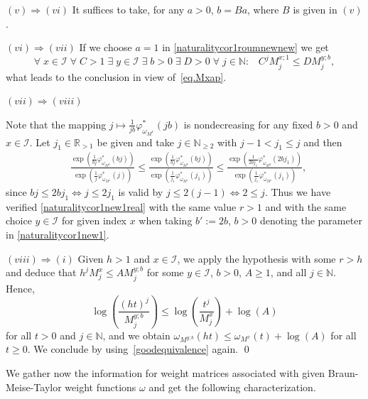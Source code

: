 \documentclass[10pt]{amsart}%
\numberwithin{equation}{section}
\theoremstyle{plain}
\newcommand{\RR}{\mathbb{R}}
\newcommand{\NN}{\mathbb{N}}
\begin{document}
$(v)\Rightarrow(vi)$ It suffices to take, for any $a>0$, $b=Ba$, where $B$ is given in $(v)$.\vspace{6pt}

$(vi)\Rightarrow(vii)$ If we choose $a=1$ in \eqref{naturalitycor1roumnewnew} we get
$$
\forall\;x\in\mathcal{I}\;\forall\;C> 1\;\exists\;y\in\mathcal{I}\;\exists\;b>0\;\exists\;D>0\;\forall\;j\in\NN:\;\;\;C^jM^{x;1}_j\le DM^{y;b}_j,
$$
what leads to the conclusion in view of~\eqref{eq.Mxap}.\vspace{6pt}

$(vii)\Rightarrow(viii)$

Note that the mapping $j\mapsto\frac{1}{jb}\varphi^{*}_{\omega_{M^x}}(jb)$ is nondecreasing for any fixed $b>0$ and $x\in\mathcal{I}$. Let $j_1\in\RR_{>1}$ be given and take $j\in\NN_{\ge 2}$ with $j-1<j_1\le j$ and then
\begin{align*}
&\frac{\exp(\frac{1}{bj}\varphi^{*}_{\omega_{M^y}}(bj))}{\exp(\frac{1}{j}\varphi^{*}_{\omega_{M^x}}(j))}\le\frac{\exp(\frac{1}{bj}\varphi^{*}_{\omega_{M^y}}(bj))}{\exp(\frac{1}{j_1}\varphi^{*}_{\omega_{M^x}}(j_1))}\le\frac{\exp(\frac{1}{2bj_1}\varphi^{*}_{\omega_{M^y}}(2bj_1))}{\exp(\frac{1}{j_1}\varphi^{*}_{\omega_{M^x}}(j_1))},
\end{align*}
since $bj\le 2bj_1\Leftrightarrow j\le 2j_1$ is valid by $j\le 2(j-1)\Leftrightarrow 2\le j$. Thus we have verified \eqref{naturalitycor1new1real} with the same value $r>1$ and with the same choice $y\in\mathcal{I}$ for given index $x$ when taking $b':=2b$, $b>0$ denoting the parameter in \eqref{naturalitycor1new1}.\vspace{6pt}

$(viii)\Rightarrow(i)$ Given $h>1$ and $x\in\mathcal{I}$, we apply the hypothesis with some $r>h$ and deduce that
$h^jM^x_j\le AM^{y;b}_j$
for some $y\in\mathcal{I}$, $b>0$, $A\ge 1$, and all $j\in\NN$.
Hence,
$$\log\left(\frac{(ht)^j}{M^{y;b}_j}\right)\le \log\left(\frac{t^j}{M^{x}_j}\right)+\log(A)$$
for all $t>0$ and $j\in\NN$, and we obtain $\omega_{M^{y;b}}(ht)\le\omega_{M^{x}}(t)+\log(A)$ for all $t\ge 0$.
We conclude by using~\eqref{goodequivalence} again.
\qed\enddemo

We gather now the information for weight matrices associated with given Braun-Meise-Taylor weight functions $\omega$ and get the following characterization.
\end{document}
